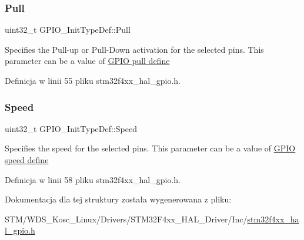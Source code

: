 \subsubsection{\texorpdfstring{Pull}{Pull}}
{\footnotesize\ttfamily uint32\+\_\+t G\+P\+I\+O\+\_\+\+Init\+Type\+Def\+::\+Pull}

Specifies the Pull-\/up or Pull-\/\+Down activation for the selected pins. This parameter can be a value of \hyperlink{group___g_p_i_o__pull__define}{G\+P\+IO pull define} 

Definicja w linii 55 pliku stm32f4xx\+\_\+hal\+\_\+gpio.\+h.

\mbox{\label{struct_g_p_i_o___init_type_def_aae3b8ba407fb4f974cbce9cc03fc189d}} 
\subsubsection{\texorpdfstring{Speed}{Speed}}
{\footnotesize\ttfamily uint32\+\_\+t G\+P\+I\+O\+\_\+\+Init\+Type\+Def\+::\+Speed}

Specifies the speed for the selected pins. This parameter can be a value of \hyperlink{group___g_p_i_o__speed__define}{G\+P\+IO speed define} 

Definicja w linii 58 pliku stm32f4xx\+\_\+hal\+\_\+gpio.\+h.



Dokumentacja dla tej struktury została wygenerowana z pliku\+:\begin{DoxyCompactItemize}
\item 
S\+T\+M/\+W\+D\+S\+\_\+\+Kosc\+\_\+\+Linux/\+Drivers/\+S\+T\+M32\+F4xx\+\_\+\+H\+A\+L\+\_\+\+Driver/\+Inc/\hyperlink{stm32f4xx__hal__gpio_8h}{stm32f4xx\+\_\+hal\+\_\+gpio.\+h}\end{DoxyCompactItemize}
